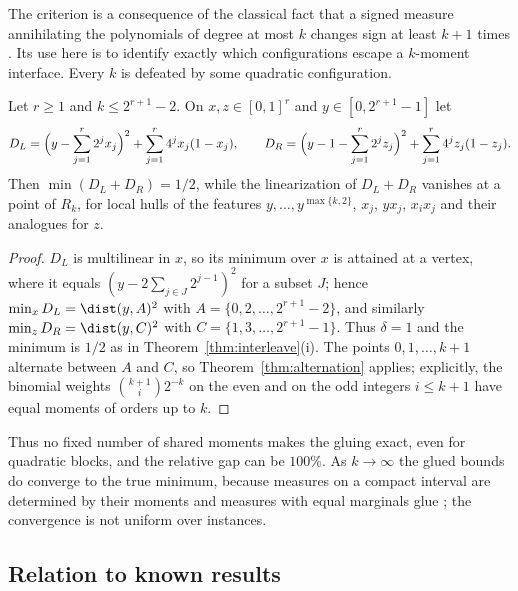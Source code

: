 The criterion is a consequence of the classical fact that a signed
measure annihilating the polynomials of degree at most $k$ changes sign at
least $k+1$ times \citep{KarlinStudden1966}. Its use here is to identify
exactly which configurations escape a $k$-moment interface. Every $k$ is
defeated by some quadratic configuration.

\begin{proposition}\label{prop:full-gap}
Let $r\ge1$ and $k\le2^{r+1}-2$. On $x,z\in[0,1]^r$ and
$y\in[0,2^{r+1}-1]$ let
\[
D_L=\Bigl(y-\sum_{j=1}^r2^jx_j\Bigr)^2+\sum_{j=1}^r4^jx_j(1-x_j),\qquad
D_R=\Bigl(y-1-\sum_{j=1}^r2^jz_j\Bigr)^2+\sum_{j=1}^r4^jz_j(1-z_j).
\]
Then $\min(D_L+D_R)=1/2$, while the linearization of $D_L+D_R$ vanishes at
a point of $R_k$, for local hulls of the features $y,\dots,y^{\max\{k,2\}}$,
$x_j$, $yx_j$, $x_ix_j$ and their analogues for $z$.
\end{proposition}

\begin{proof}
$D_L$ is multilinear in $x$, so its minimum over $x$ is attained at a
vertex, where it equals $(y-2\sum_{j\in J}2^{j-1})^2$ for a subset $J$; hence
$\min_xD_L=\dist(y,A)^2$ with $A=\{0,2,\dots,2^{r+1}-2\}$, and similarly
$\min_zD_R=\dist(y,C)^2$ with $C=\{1,3,\dots,2^{r+1}-1\}$. Thus $\delta=1$ and
the minimum is $1/2$ as in Theorem~\ref{thm:interleave}(i). The points
$0,1,\dots,k+1$ alternate between $A$ and $C$, so Theorem~\ref{thm:alternation}
applies; explicitly, the binomial weights $\binom{k+1}i2^{-k}$ on the even
and on the odd integers $i\le k+1$ have equal moments of orders up to $k$.
\end{proof}

Thus no fixed number of shared moments makes the gluing exact, even for
quadratic blocks, and the relative gap can be $100\%$. As $k\to\infty$ the
glued bounds do converge to the true minimum, because measures on a
compact interval are determined by their moments and measures with equal
marginals glue \citep[Lemma~6.3]{Lasserre2006}; the convergence is not
uniform over instances.

\subsection{Relation to known results}\label{sec:composition-literature}

